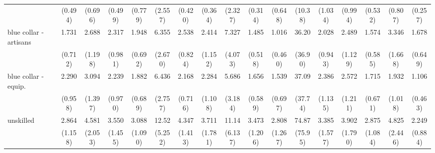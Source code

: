 {\begin{tabular}{l*{16}{c}}
                    &     (0.494)         &     (0.696)         &     (0.499)         &     (0.779)         &     (2.557)         &     (0.420)         &     (0.364)         &     (2.327)         &     (0.314)         &     (0.648)         &     (10.38)         &     (1.034)         &     (0.994)         &     (0.532)         &     (0.807)         &     (0.257)         \\
[1em]
blue collar - artisans&       1.731         &       2.688\sym{*}  &       2.317\sym{*}  &       1.948         &       6.355\sym{***}&       2.538\sym{**} &       2.414         &       7.327\sym{***}&       1.485         &       1.016         &       36.20\sym{***}&       2.028         &       2.489\sym{*}  &       1.574         &       3.346\sym{*}  &       1.678         \\
                    &     (0.712)         &     (1.198)         &     (0.981)         &     (0.692)         &     (2.670)         &     (0.824)         &     (1.152)         &     (4.073)         &     (0.518)         &     (0.460)         &     (36.90)         &     (0.943)         &     (1.129)         &     (0.585)         &     (1.668)         &     (0.649)         \\
[1em]
blue collar - equip.&       2.290\sym{*}  &       3.094\sym{*}  &       2.239         &       1.882         &       6.436\sym{***}&       2.168\sym{*}  &       2.284         &       5.686\sym{**} &       1.656         &       1.539         &       37.09\sym{***}&       2.386         &       2.572\sym{*}  &       1.715         &       1.932         &       1.106         \\
                    &     (0.958)         &     (1.397)         &     (0.970)         &     (0.689)         &     (2.757)         &     (0.716)         &     (1.108)         &     (3.184)         &     (0.589)         &     (0.697)         &     (37.74)         &     (1.135)         &     (1.211)         &     (0.671)         &     (1.018)         &     (0.463)         \\
[1em]
unskilled           &       2.864\sym{**} &       4.581\sym{***}&       3.550\sym{**} &       3.088\sym{**} &       12.52\sym{***}&       4.347\sym{***}&       3.711\sym{**} &       11.14\sym{***}&       3.473\sym{***}&       2.808\sym{*}  &       74.87\sym{***}&       3.385\sym{**} &       3.902\sym{**} &       2.875\sym{**} &       4.825\sym{**} &       2.249\sym{*}  \\
                    &     (1.158)         &     (2.053)         &     (1.455)         &     (1.090)         &     (5.252)         &     (1.413)         &     (1.781)         &     (6.137)         &     (1.206)         &     (1.267)         &     (75.95)         &     (1.577)         &     (1.790)         &     (1.084)         &     (2.446)         &     (0.884)         \\

\end{tabular}}
